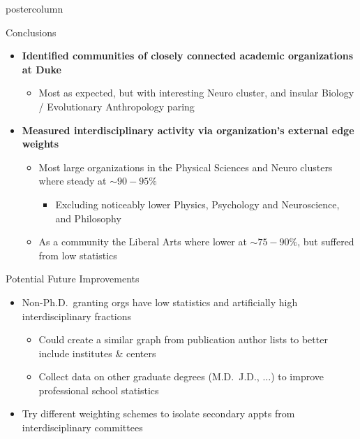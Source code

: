 \documentclass{beamer}
\begin{document}
\begin{frame}
\begin{columns}
\begin{column}{.57\textwidth}
\begin{beamercolorbox}[center]{postercolumn}
\begin{minipage}{.98\textwidth}
{  \begin{myblock}{Conclusions}%
    \begin{itemize}
      \item \textbf{Identified communities of closely connected academic organizations at Duke}
      \begin{itemize}
        \item Most as expected, but with interesting Neuro cluster, and insular Biology / Evolutionary Anthropology paring
      \end{itemize}
      \item \textbf{Measured interdisciplinary activity via  organization's external edge weights }
      \begin{itemize}
        \item Most large organizations in the Physical Sciences and Neuro clusters where steady at $\sim90-95\%$
        \begin{itemize}
          \item Excluding noticeably lower Physics, Psychology and Neuroscience, and Philosophy
        \end{itemize}
        \item As a community the Liberal Arts where lower at $\sim75-90\%$, but suffered from low statistics
      \end{itemize}
    \end{itemize}
  \end{myblock}\vfill


  \begin{myblock}{Potential Future Improvements}%
    \begin{itemize}
      \item Non-Ph.D.\ granting orgs have low statistics and artificially high interdisciplinary fractions
      \begin{itemize}
        \item Could create a similar graph from publication author lists to better include institutes \& centers
        \item Collect data on other graduate degrees (M.D.\, J.D., $\ldots$) to improve professional school statistics
      \end{itemize}
      \item Try different weighting schemes to isolate secondary appts from interdisciplinary committees
    \end{itemize}
  \end{myblock}\vfill


}\end{minipage}\end{beamercolorbox}
\end{column}


\end{columns}
\end{frame}
\end{document}
